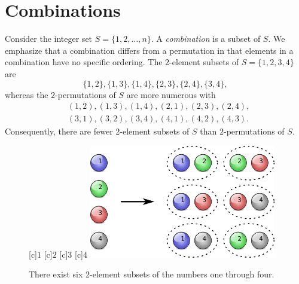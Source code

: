 \section{Combinations}

Consider the integer set $S = \{ 1, 2, \ldots, n \}$.
A \emph{combination} is a subset of $S$. 
We emphasize that a combination differs from a permutation in that elements in a combination have no specific ordering.
The $2$-element subsets of $S = \{ 1, 2, 3, 4 \}$ are
\begin{equation*}
\{ 1, 2 \}, \{ 1, 3 \}, \{ 1, 4 \}, \{ 2, 3 \}, \{ 2, 4 \}, \{ 3, 4 \} ,
\end{equation*}
whereas the $2$-permutations of $S$ are more numerous with
\begin{equation*}
\begin{split}
&( 1, 2 ), ( 1, 3 ), ( 1, 4 ), ( 2, 1 ), ( 2, 3 ), ( 2, 4 ), \\
&( 3, 1 ), ( 3, 2 ), ( 3, 4 ), ( 4, 1 ), ( 4, 2 ), ( 4, 3 ) .
\end{split}
\end{equation*}
Consequently, there are fewer $2$-element subsets of $S$ than $2$-permutations of $S$.

\begin{figure}[htb!]
\begin{center}
\begin{psfrags}
[c]{$1$}
[c]{$2$}
[c]{$3$}
[c]{$4$}
\includegraphics[height=4.95cm]{Figures/4Chapter/combination}
\end{psfrags}
\caption{There exist six 2-element subsets of the numbers one through four.}
\label{figure:Combination}
\end{center}
\end{figure}

